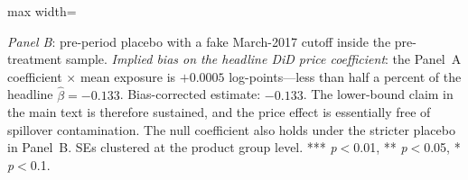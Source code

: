 \begin{table}[htbp]
\begin{adjustbox}{max width=\textwidth}
\begin{threeparttable}
\begin{tablenotes}
\textit{Panel B}: pre-period placebo with a fake March-2017 cutoff inside
the pre-treatment sample.
\textit{Implied bias on the headline DiD price coefficient}: the Panel~A
coefficient $\times$ mean exposure is $+0.0005$ log-points---less than half a
percent of the headline $\hat\beta = -0.133$. Bias-corrected estimate: $-0.133$.
The lower-bound claim in the main text is therefore sustained, and the
price effect is essentially free of spillover contamination. The null
coefficient also holds under the stricter placebo in Panel~B.
SEs clustered at the product group level.
*** \textit{p}$<$0.01, ** \textit{p}$<$0.05, * \textit{p}$<$0.1.
\end{tablenotes}
\end{threeparttable}
\end{adjustbox}
\end{table}
